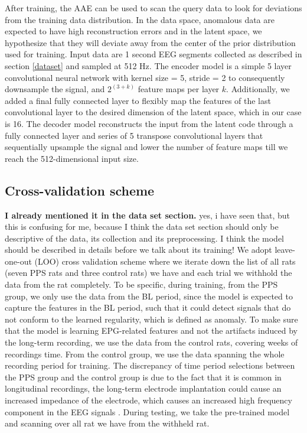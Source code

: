 \documentclass{article}
\begin{document}
	After training, the AAE can be used to scan the query data to look for deviations from the training data distribution. In the data space, anomalous data are expected to have high reconstruction errors and in the latent space, we hypothesize that they will deviate away from the center of the prior distribution used for training.
	Input data are 1 second EEG segments collected as described in section \ref{dataset} and sampled at 512 Hz. The encoder model is a simple 5 layer convolutional neural network with kernel size = 5, stride = 2 to consequently downsample the signal, and $2^{(3+k)}$ feature maps per layer $k$. Additionally, we added a final fully connected layer to flexibly map the features of the last convolutional layer to the desired dimension of the latent space, which in our case is 16. The decoder model reconstructs the input from the latent code through a fully connected layer and series of 5 transpose convolutional layers that sequentially upsample the signal and lower the number of feature maps till we reach the 512-dimensional input size.   
	
	\subsection{Cross-validation scheme}
	\textbf{I already mentioned it in the data set section.}
	yes, i have seen that, but this is confusing for me, because  I think the data set section should only be descriptive of the data, its collection and its preprocessing. I think the model should be described in details before we talk about its training! 
	We adopt leave-one-out (LOO) cross validation scheme where we iterate down the list of all rats (seven PPS rats and three control rats) we have and each trial we withhold the data from the rat completely. To be specific, during training, from the PPS group, we only use the data from the BL period, since the model is expected to capture the features in the BL period, such that it could detect signals that do not conform to the learned regularity, which is defined as anomaly. 
	To make sure that the model is learning EPG-related features and not the artifacts induced by the long-term recording, we use the data from the control rats, covering weeks of recordings time.   
	From the control group, we use the data spanning the whole recording period for training. The discrepancy of time period selections between the PPS group and the control group is due to the fact that it is common in longitudinal recordings, the long-term electrode implantation could cause an increased impedance of the electrode, which causes an increased high frequency component in the EEG signals \cite{straka2018characterizing}. During testing, we take the pre-trained model and scanning over all rat we have from the withheld rat.
	
\end{document}
